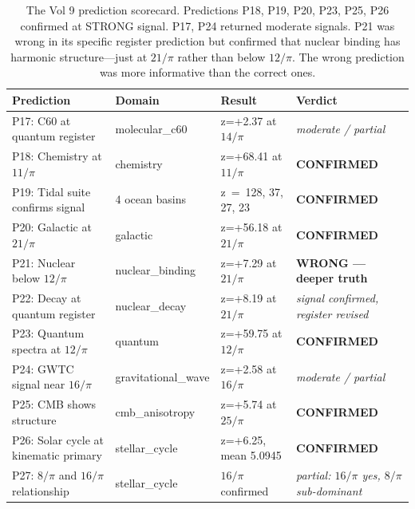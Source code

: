 \documentclass[11pt, letterpaper, openany]{book}
\begin{document}
\begin{table}[H]
\centering
\renewcommand{\arraystretch}{1.4}
\small
\begin{tabular}{|l|l|l|p{4.2cm}|}
\hline
\rowcolor{kishblue!10}
\textbf{Prediction} & \textbf{Domain} & \textbf{Result} & \textbf{Verdict} \\
\hline\hline
\rowcolor{signalgreen!8}
P17: C60 at quantum register    & molecular\_c60    & z=+2.37 at $14/\pi$   & \textit{moderate / partial} \\
\rowcolor{signalgreen!8}
P18: Chemistry at $11/\pi$      & chemistry         & z=+68.41 at $11/\pi$  & \textbf{CONFIRMED} \\
\rowcolor{signalgreen!8}
P19: Tidal suite confirms signal & 4 ocean basins   & z~=~128, 37, 27, 23   & \textbf{CONFIRMED} \\
\rowcolor{signalgreen!8}
P20: Galactic at $21/\pi$       & galactic          & z=+56.18 at $21/\pi$  & \textbf{CONFIRMED} \\
\rowcolor{nuclearpurple!8}
P21: Nuclear below $12/\pi$     & nuclear\_binding  & z=+7.29 at $21/\pi$   & \textbf{WRONG --- deeper truth} \\
\rowcolor{signalgreen!8}
P22: Decay at quantum register  & nuclear\_decay    & z=+8.19 at $21/\pi$   & \textit{signal confirmed, register revised} \\
\rowcolor{signalgreen!8}
P23: Quantum spectra at $12/\pi$ & quantum          & z=+59.75 at $12/\pi$  & \textbf{CONFIRMED} \\
\rowcolor{signalgreen!8}
P24: GWTC signal near $16/\pi$  & gravitational\_wave & z=+2.58 at $16/\pi$ & \textit{moderate / partial} \\
\rowcolor{signalgreen!8}
P25: CMB shows structure        & cmb\_anisotropy   & z=+5.74 at $25/\pi$   & \textbf{CONFIRMED} \\
\rowcolor{signalgreen!8}
P26: Solar cycle at kinematic primary & stellar\_cycle & z=+6.25, mean 5.0945 & \textbf{CONFIRMED} \\
\rowcolor{signalgreen!8}
P27: $8/\pi$ and $16/\pi$ relationship & stellar\_cycle & $16/\pi$ confirmed & \textit{partial: $16/\pi$ yes, $8/\pi$ sub-dominant} \\
\hline
\end{tabular}
\caption{The Vol 9 prediction scorecard. Predictions P18, P19, P20, P23, P25, P26
confirmed at STRONG signal. P17, P24 returned moderate signals. P21 was wrong in
its specific register prediction but confirmed that nuclear binding has harmonic
structure---just at $21/\pi$ rather than below $12/\pi$. The wrong prediction was
more informative than the correct ones.}
\label{tab:predictions_scorecard}
\end{table}
\end{document}

